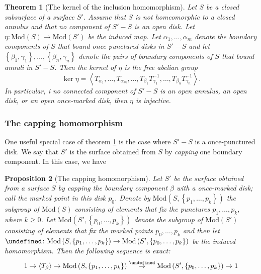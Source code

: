 \documentclass[reqno]{amsart}
\newtheorem{theorem}{Theorem}[section]
\newtheorem{proposition}[theorem]{Proposition}
\theoremstyle{definition}
\theoremstyle{remark}
\newcommand{\Mod}{{\mathrm{Mod}}}
\let\Cap\undefined
\newcommand{\Cap}{{\mathcal{C}}ap}
\begin{document}
\begin{theorem}[The kernel of the inclusion homomorphism]
    \label{kernel-of-inclusion-homomorphism}
   Let $S$ be a closed subsurface of a surface $S'$.
   Assume that $S$ is not homeomorphic to a closed
   annulus and that no component of $S' - S$ is an open
   disk. Let $\eta \colon \Mod(S) \to \Mod(S')$ be the
   induced map. Let $\alpha_1, \ldots, \alpha_m$ denote
   the boundary components of $S$ that bound once-punctured
   disks in $S' - S$ and let
   $\left\{ \beta_1, \gamma_1 \right\} ,\ldots , 
   \left\{ \beta_n , \gamma_n \right\} $ denote the pairs
   of boundary components of $S$ that bound annuli
   in $S' - S$. Then the kernel of $\eta $ is the free abelian
   group
   \[
   \ker \eta = \left<T_{\alpha_1}, \ldots,
   T_{\alpha_m}, \ldots, T_{\beta_1} T_{\gamma_1}^{-1},
   \ldots, T_{\beta_n}T_{\gamma_n}^{-1}\right>.
   \] 
   In particular, i no connected component of
   $S' - S$ is an open annulus, an open disk, or
   an open once-marked disk, then $\eta$ is injective.
\end{theorem}


\subsubsection{The capping homomorphism}

One useful special case of theorem \ref{kernel-of-inclusion-homomorphism} is
the case where $S' - S$ is a once-punctured disk. We say that
$S'$ is the surface obtained from
$S$ by \textit{capping} one boundary component. In this
case, we have

\begin{proposition}[The capping homomorphism]
    Let $S'$ be the surface obtained from a surface
    $S$ by capping the boundary component $\beta $ with
    a once-marked disk; call the marked point in this disk
    $p_0$. Denote by 
    $\Mod \left( S, \left\{ p_1, \ldots, p_k \right\}  \right) $ 
    the subgroup of $\Mod(S)$ consisting of elements
    that fix the punctures $p_1, \ldots, p_k$, where
    $k \ge 0$. Let
    $\Mod \left( S', \left\{ p_0, \ldots, p_k \right\}  \right) $ 
    denote the subgroup of $\Mod(S')$ consisting
    of elements that fix the marked points
    $p_0, \ldots, p_k$ and then let
    $\Cap \colon \Mod \left( S, \left\{ p_1, \ldots,
    p_k \right\}  \right) \to \Mod \left( S',
    \left\{ p_0, \ldots, p_k \right\} \right) $ be the
    induced homomorphism. Then the following
    sequence is exact:
    \[
    1 \to 
    \left<T_{\beta} \right>
    \to \Mod \left( S, \left\{ p_1, \ldots, p_k \right\}  \right) 
    \stackrel{\Cap}{\to}  
    \Mod \left( S', \left\{ p_0, \ldots, p_k \right\}  \right) 
    \to 1
    \] 
\end{proposition}
\end{document}
